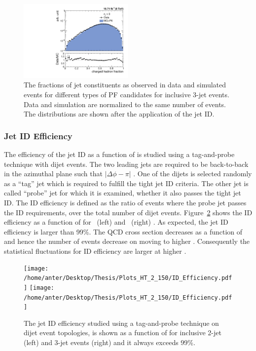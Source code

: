 \begin{figure}[!htbp]
\begin{center}
    \includegraphics[width=0.5\textwidth]{Plots_HT_2_150/Comparison_ChHadFrac_3_HT_2_150.pdf}%
    \caption{The fractions of jet constituents as observed in data and simulated events for different types of PF candidates for inclusive 3-jet events. Data and simulation are normalized to the same number of events. The distributions are shown after the application of the jet ID.}
    \label{fig:qual3}
  \end{center}
\end{figure} 

\subsubsection{Jet ID Efficiency}
The efficiency of the jet ID as a function of \httwo is studied using a tag-and-probe technique with dijet events. The two leading jets are required to be back-to-back in the azimuthal plane such that $|\Delta\phi - \pi|$ . One of the dijets is selected randomly as a ``tag'' jet which is required to fulfill the tight jet ID criteria. The other jet is called ``probe'' jet for which it is examined, whether it also passes the tight jet ID. The ID efficiency is defined as the ratio of events where the probe jet passes the ID requirements, over the total number of dijet events. Figure~\ref{fig:ideff} shows the ID efficiency as a function of \httwo for \njt~(left) and \njth~(right) \qm. As expected, the jet ID efficiency is larger than 99\%. The QCD cross section decreases as a function of \httwo and hence the number of events decrease on moving to higher \httwons. Consequently the statistical fluctuations for ID efficiency are larger at higher \httwons.

\begin{figure}[!htbp]
  \begin{center}
    \texttt{[image: /home/anter/Desktop/Thesis/Plots\_HT\_2\_150/ID\_Efficiency.pdf]}%
    \texttt{[image: /home/anter/Desktop/Thesis/Plots\_HT\_2\_150/ID\_Efficiency.pdf]}%
    \caption{The jet ID efficiency studied using a tag-and-probe technique on dijet event topologies, is shown as a function of \httwo for inclusive 2-jet (left) and 3-jet events (right) and it always exceeds 99\%.}
    \label{fig:ideff}
  \end{center}
\end{figure} 

